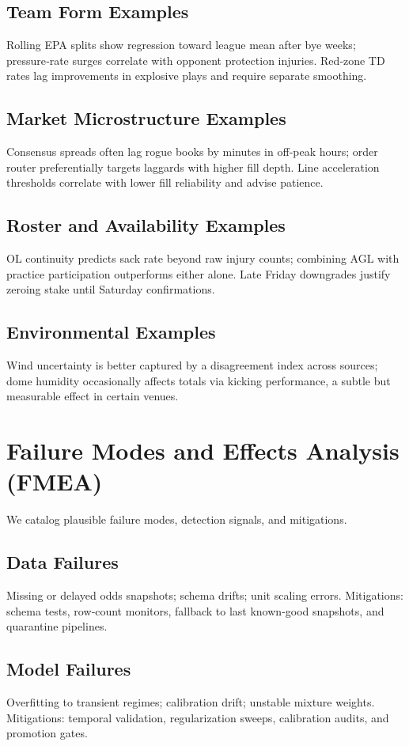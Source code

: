 \documentclass[12pt]{report}  %
\numberwithin{equation}{section}
\theoremstyle{plain}
\theoremstyle{definition}
\theoremstyle{remark}
\begin{document}
\section{Team Form Examples}
Rolling EPA splits show regression toward league mean after bye weeks; pressure‑rate surges correlate with opponent protection injuries. Red‑zone TD rates lag improvements in explosive plays and require separate smoothing.

\section{Market Microstructure Examples}
Consensus spreads often lag rogue books by minutes in off‑peak hours; order router preferentially targets laggards with higher fill depth. Line acceleration thresholds correlate with lower fill reliability and advise patience.

\section{Roster and Availability Examples}
OL continuity predicts sack rate beyond raw injury counts; combining AGL with practice participation outperforms either alone. Late Friday downgrades justify zeroing stake until Saturday confirmations.

\section{Environmental Examples}
Wind uncertainty is better captured by a disagreement index across sources; dome humidity occasionally affects totals via kicking performance, a subtle but measurable effect in certain venues.

\chapter{Failure Modes and Effects Analysis (FMEA)}
We catalog plausible failure modes, detection signals, and mitigations.

\section{Data Failures}
Missing or delayed odds snapshots; schema drifts; unit scaling errors. Mitigations: schema tests, row‑count monitors, fallback to last known‑good snapshots, and quarantine pipelines.

\section{Model Failures}
Overfitting to transient regimes; calibration drift; unstable mixture weights. Mitigations: temporal validation, regularization sweeps, calibration audits, and promotion gates.
\end{document}
